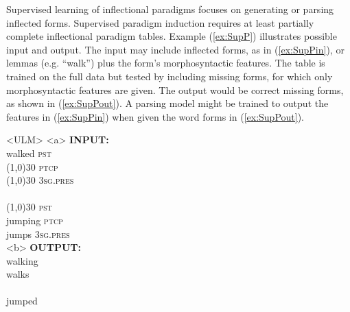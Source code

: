 \documentclass[12pt]{article}
\begin{document}
Supervised learning of inflectional paradigms 
focuses on generating or parsing inflected forms. Supervised paradigm induction requires at least partially complete inflectional paradigm tables. 
Example (\ref{ex:SupP}) illustrates possible input and output. The input may include inflected forms, as in (\ref{ex:SupPin}), or lemmas (e.g. ``walk'') plus the form's morphosyntactic features. The table is trained on the full data but tested by including missing forms, for which only morphosyntactic features are given. The output would be correct missing forms, as shown in (\ref{ex:SupPout}). A parsing model might be trained to output the features in (\ref{ex:SupPin}) when given the word forms in (\ref{ex:SupPout}).

\begin{singlespace}
\pex<ULM>   
\label{ex:SupP}
\a<a> \textbf{INPUT:}  \\
        walked \hspace{.73cm} \textsc{pst} \\
         \line(1,0){30}  \hspace{1cm} \textsc{ptcp}\\
         \line(1,0){30} \hspace{1cm} \textsc{3sg.pres} \\
         \\
         \line(1,0){30} \hspace{1.05cm} \textsc{pst} \\
         jumping \hspace{.6cm} \textsc{ptcp} \\
         jumps \hspace{.95cm} \textsc{3sg.pres} \\
\label{ex:SupPin}
\a<b> \textbf{OUTPUT:} \\
         walking \\
         walks  \\
         \\
        jumped 
\label{ex:SupPout}
\xe
\end{singlespace}
\end{document}
